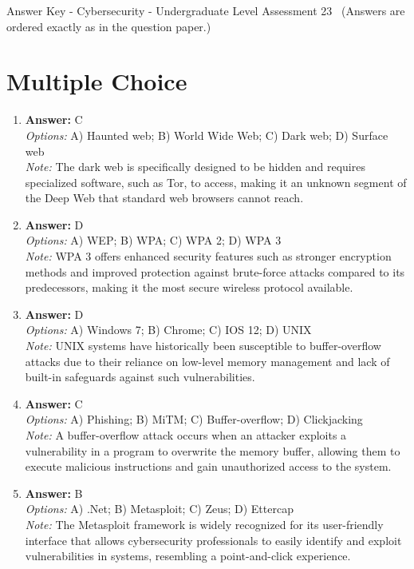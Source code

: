 \documentclass[12pt]{article}
\begin{document}
\begin{center}
Answer Key - Cybersecurity - Undergraduate Level Assessment 23 \
\small (Answers are ordered exactly as in the question paper.)
\end{center}

\section*{Multiple Choice}
\begin{enumerate}[label=\arabic*.]
\item \textbf{Answer:} C
\\ \textit{Options:} A) Haunted web; B) World Wide Web; C) Dark web; D) Surface web
\\ \textit{Note:} The dark web is specifically designed to be hidden and requires specialized software, such as Tor, to access, making it an unknown segment of the Deep Web that standard web browsers cannot reach.
\item \textbf{Answer:} D
\\ \textit{Options:} A) WEP; B) WPA; C) WPA 2; D) WPA 3
\\ \textit{Note:} WPA 3 offers enhanced security features such as stronger encryption methods and improved protection against brute-force attacks compared to its predecessors, making it the most secure wireless protocol available.
\item \textbf{Answer:} D
\\ \textit{Options:} A) Windows 7; B) Chrome; C) IOS 12; D) UNIX
\\ \textit{Note:} UNIX systems have historically been susceptible to buffer-overflow attacks due to their reliance on low-level memory management and lack of built-in safeguards against such vulnerabilities.
\item \textbf{Answer:} C
\\ \textit{Options:} A) Phishing; B) MiTM; C) Buffer-overflow; D) Clickjacking
\\ \textit{Note:} A buffer-overflow attack occurs when an attacker exploits a vulnerability in a program to overwrite the memory buffer, allowing them to execute malicious instructions and gain unauthorized access to the system.
\item \textbf{Answer:} B
\\ \textit{Options:} A) .Net; B) Metasploit; C) Zeus; D) Ettercap
\\ \textit{Note:} The Metasploit framework is widely recognized for its user-friendly interface that allows cybersecurity professionals to easily identify and exploit vulnerabilities in systems, resembling a point-and-click experience.
\end{enumerate}
\end{document}
